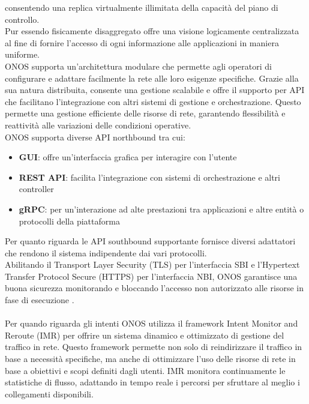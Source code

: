 consentendo una replica virtualmente illimitata della capacità del piano di controllo.
\\Pur essendo fisicamente disaggregato offre una visione logicamente centralizzata al fine di fornire l'accesso di ogni informazione alle applicazioni in maniera uniforme.
\\ONOS supporta un'architettura modulare che permette agli operatori di configurare e adattare facilmente la rete alle loro esigenze specifiche.
Grazie alla sua natura distribuita, consente una gestione scalabile e offre il supporto per API che facilitano l'integrazione con altri sistemi di gestione e orchestrazione.
Questo permette una gestione efficiente delle risorse di rete, garantendo flessibilità e reattività alle variazioni delle condizioni operative.
\\ONOS supporta diverse API northbound tra cui:
\begin{itemize}
\item \textbf{GUI}: offre un'interfaccia grafica per interagire con l'utente
\item \textbf{REST API}: facilita l'integrazione con sistemi di orchestrazione e altri controller 
\item \textbf{gRPC}: per un'interazione ad alte prestazioni tra applicazioni e altre entità o protocolli della piattaforma
\end{itemize}
Per quanto riguarda le API southbound supportante fornisce diversi adattatori che rendono il sistema indipendente dai vari protocolli.
\\Abilitando il Transport Layer Security (TLS) per l'interfaccia SBI e l'Hypertext Transfer Protocol Secure (HTTPS) per l'interfaccia NBI, 
ONOS garantisce una buona sicurezza monitorando e bloccando l'accesso non autorizzato alle risorse in fase di esecuzione \cite{artONOS}.
\\
\\Per quando riguarda gli intenti ONOS utilizza il framework Intent Monitor and Reroute (IMR) per offrire un sistema dinamico e ottimizzato di gestione del traffico in rete.
Questo framework permette non solo di reindirizzare il traffico in base a necessità specifiche, ma anche di ottimizzare l'uso delle risorse di rete in base a obiettivi e scopi definiti dagli utenti.
IMR monitora continuamente le statistiche di flusso, adattando in tempo reale i percorsi per sfruttare al meglio i collegamenti disponibili.
